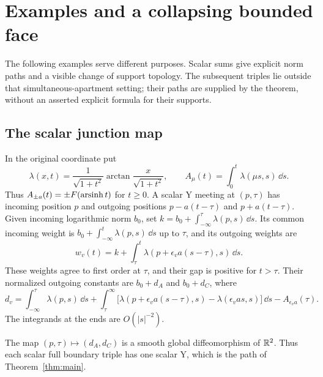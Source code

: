 \section{Examples and a collapsing bounded face}\label{sec:examples}

The following examples serve different purposes. Scalar sums give
explicit norm paths and a visible change of support topology. The
subsequent triples lie outside that simultaneous-apartment setting;
their paths are supplied by the theorem, without an asserted explicit
formula for their supports.

\subsection{The scalar junction map}
In the original coordinate put
\[
 \lambda(x,t)=\frac{1}{\sqrt{1+t^2}}
                   \arctan\frac{x}{\sqrt{1+t^2}},\qquad
 A_\mu(t)=\int_0^t\lambda(\mu s,s)\,\dd s.
\]
Thus $A_{\pm a}(t)=\pm F(\operatorname{arsinh} t)$ for $t\ge0$.
A scalar Y meeting at $(p,\tau)$ has incoming position $p$
and outgoing positions $p-a(t-\tau)$ and $p+a(t-\tau)$.
Given incoming logarithmic norm $b_0$, set
$k=b_0+\int_{-\infty}^\tau\lambda(p,s)\,\dd s$.
Its common incoming weight is
$b_0+\int_{-\infty}^t\lambda(p,s)\,\dd s$ up to $\tau$,
and its outgoing weights are
\[
 w_v(t)=k+\int_\tau^t\lambda(p+\epsilon_va(s-\tau),s)\,\dd s.
\]
These weights agree to first order at $\tau$, and their gap is
positive for $t>\tau$. Their normalized outgoing constants are
$b_0+d_A$ and $b_0+d_C$, where
\begin{equation}\label{eq:scalarboundarymap}
 d_v=\int_{-\infty}^\tau\lambda(p,s)\,\dd s
  +\int_\tau^\infty
       \bigl[\lambda(p+\epsilon_va(s-\tau),s)
                    -\lambda(\epsilon_va s,s)\bigr]\,\dd s
  -A_{\epsilon_va}(\tau).
\end{equation}
The integrands at the ends are $O(|s|^{-2})$.

\begin{proposition}\label{prop:scalarjunction}
The map $(p,\tau)\mapsto(d_A,d_C)$ is a smooth global
diffeomorphism of $\mathbb R^2$. Thus each scalar full boundary triple
has one scalar Y, which is the path of Theorem~\ref{thm:main}.
\end{proposition}

